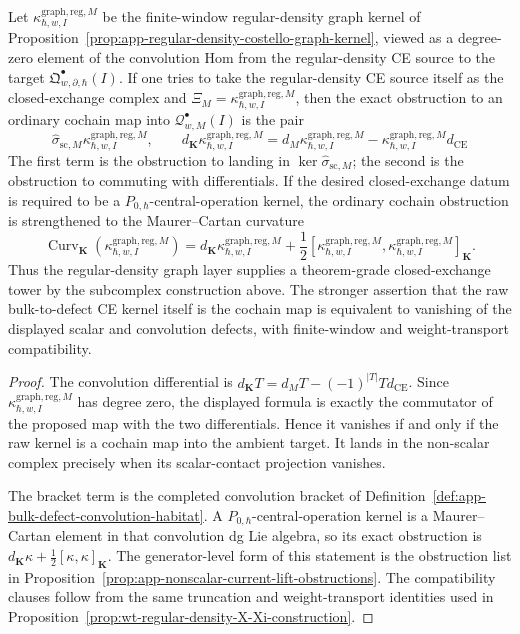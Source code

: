\begin{prop}
\label{prop:wt-raw-kappa-cochain-obstruction}
  Let
  \(\kappa^{\mathrm{graph,reg},M}_{\hbar,w,I}\) be the finite-window
  regular-density graph kernel of
  Proposition~\ref{prop:app-regular-density-costello-graph-kernel},
  viewed as a degree-zero element of the convolution Hom from the
  regular-density CE source to the target
  \(\mathfrak Q^\bullet_{w,\partial,\hbar}(I)\).  If one tries to take the
  regular-density CE source itself as the closed-exchange complex and
  \(\Xi_M=\kappa^{\mathrm{graph,reg},M}_{\hbar,w,I}\), then the exact
  obstruction to an ordinary cochain map into
  \(\mathcal Q^\bullet_{w,M}(I)\) is the pair
  \[
    \widehat\sigma_{\mathrm{sc},M}
      \kappa^{\mathrm{graph,reg},M}_{\hbar,w,I},
    \qquad
    d_{\mathbf K}\kappa^{\mathrm{graph,reg},M}_{\hbar,w,I}
      =
      d_M\kappa^{\mathrm{graph,reg},M}_{\hbar,w,I}
      -
      \kappa^{\mathrm{graph,reg},M}_{\hbar,w,I}d_{\mathrm{CE}}
  \]
  The first term is the obstruction to landing in
  \(\ker\widehat\sigma_{\mathrm{sc},M}\); the second is the obstruction
  to commuting with differentials.  If the desired closed-exchange datum
  is required to be a \(P_{0,\hbar}\)-central-operation kernel, the
  ordinary cochain obstruction is strengthened to the Maurer--Cartan
  curvature
  \[
    \operatorname{Curv}_{\mathbf K}
      (\kappa^{\mathrm{graph,reg},M}_{\hbar,w,I})
      =
      d_{\mathbf K}\kappa^{\mathrm{graph,reg},M}_{\hbar,w,I}
      +\frac12[
        \kappa^{\mathrm{graph,reg},M}_{\hbar,w,I},
        \kappa^{\mathrm{graph,reg},M}_{\hbar,w,I}
      ]_{\mathbf K}.
  \]
  Thus the regular-density graph layer supplies a theorem-grade
  closed-exchange tower by the subcomplex construction above.  The
  stronger assertion that the raw bulk-to-defect CE kernel itself is the
  cochain map is equivalent to vanishing of the displayed scalar and
  convolution defects, with finite-window and weight-transport
  compatibility.
\end{prop}

\begin{proof}
  The convolution differential is
  \(d_{\mathbf K}T=d_MT-(-1)^{|T|}Td_{\mathrm{CE}}\).  Since
  \(\kappa^{\mathrm{graph,reg},M}_{\hbar,w,I}\) has degree zero, the
  displayed formula is exactly the commutator of the proposed map with the
  two differentials.  Hence it vanishes if and only if the raw kernel is a
  cochain map into the ambient target.  It lands in the non-scalar complex
  precisely when its scalar-contact projection vanishes.

  The bracket term is the completed convolution bracket of
  Definition~\ref{def:app-bulk-defect-convolution-habitat}.  A
  \(P_{0,\hbar}\)-central-operation kernel is a Maurer--Cartan element in
  that convolution dg Lie algebra, so its exact obstruction is
  \(d_{\mathbf K}\kappa+\frac12[\kappa,\kappa]_{\mathbf K}\).  The
  generator-level form of this statement is the obstruction list in
  Proposition~\ref{prop:app-nonscalar-current-lift-obstructions}.  The
  compatibility clauses follow from the same truncation and weight-transport
  identities used in
  Proposition~\ref{prop:wt-regular-density-X-Xi-construction}.
\end{proof}

